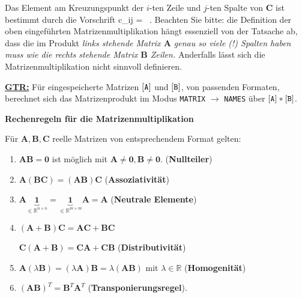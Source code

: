 \medskip
\noindent
Das Element am Kreuzungspunkt der $i$-ten Zeile und $j$-ten
Spalte von $\mathbf{C}$ ist bestimmt durch die Vorschrift
%
\be
c_{ij} =  \ .
\ee
%
Beachten Sie bitte: die Definition der oben eingef\"uhrten
Matrizenmultiplikation h\"angt essenziell von der Tatsache ab, dass
die im Produkt {\em links stehende Matrix $\mathbf{A}$ genau so
viele (!) Spalten haben muss wie die rechts stehende Matrix
$\mathbf{B}$ Zeilen.\/} Anderfalls l\"asst sich die
Matrizenmultiplikation nicht sinnvoll definieren.

\medskip
\noindent
\underline{\bf GTR:} F\"ur eingespeicherte Matrizen ${\tt [A]}$
und ${\tt [B]}$, von passenden Formaten, berechnet sich das
Matrizenprodukt im Modus {\tt MATRIX} $\rightarrow$ {\tt NAMES}
\"uber ${\tt [A]*[B]}$.

\medskip
\noindent
{\bf Rechenregeln f\"ur die Matrizenmultiplikation}

\noindent
F\"{u}r $\mathbf{A}, \mathbf{B}, \mathbf{C}$ reelle Matrizen
von entsprechendem Format gelten:

\begin{enumerate}
	\item $\mathbf{A}\mathbf{B} = \mathbf{0}$ ist m\"oglich
	mit $\mathbf{A}\neq\mathbf{0},\mathbf{B}\neq\mathbf{0}$.
	\hfill ({\bf Nullteiler})
	\item $\mathbf{A}(\mathbf{B}\mathbf{C})
	= (\mathbf{A}\mathbf{B})\mathbf{C}$
	\hfill ({\bf Assoziativit\"at})
	\item $\mathbf{A}
	\underbrace{\mathbf{1}}_{\in \mathbb{R}^{n \times n}}
	=\underbrace{\mathbf{1}}_{\in \mathbb{R}^{m \times m}}
	\mathbf{A}=\mathbf{A}$
	\hfill ({\bf Neutrale Elemente})
	\item $(\mathbf{A}+\mathbf{B})\mathbf{C}
	= \mathbf{A}\mathbf{C}+\mathbf{B}\mathbf{C}$
	
	$\mathbf{C}(\mathbf{A}+\mathbf{B})
	= \mathbf{C}\mathbf{A}+\mathbf{C}\mathbf{B}$
	\hfill ({\bf Distributivit\"at})
	\item $\mathbf{A}(\lambda\mathbf{B})
	=(\lambda\mathbf{A})\mathbf{B}
	=\lambda(\mathbf{A}\mathbf{B})$
	mit $\lambda \in \mathbb{R}$ 
	\hfill ({\bf Homogenit\"at})
	\item $(\mathbf{A}\mathbf{B})^{T}
	=\mathbf{B}^{T}\mathbf{A}^{T}$
	\hfill ({\bf Transponierungsregel}).
\end{enumerate}

